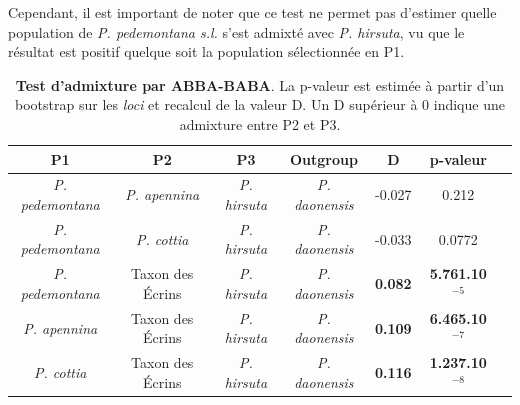 Cependant, il est important de noter que ce test ne permet pas d'estimer quelle population de \textit{P. pedemontana s.l.} s'est admixté avec \textit{P. hirsuta}, vu que le résultat est positif quelque soit la population sélectionnée en P1.

\begin{table}[!h]
\begin{tabular}{ccccccc}\\\toprule  
P1 & P2 & P3 & Outgroup & D & p-valeur \\ \midrule
\textit{P. pedemontana} & \textit{P. apennina} & \textit{P. hirsuta} & \textit{P. daonensis} & -0.027 & 0.212 \\
\textit{P. pedemontana} & \textit{P. cottia} & \textit{P. hirsuta} & \textit{P. daonensis} & -0.033 & 0.0772 \\ \midrule
\textit{P. pedemontana} & Taxon des Écrins & \textit{P. hirsuta} & \textit{P. daonensis} & \textbf{0.082} & \textbf{5.761.10$^{-5}$} \\
\textit{P. apennina} & Taxon des Écrins & \textit{P. hirsuta} & \textit{P. daonensis} & \textbf{0.109} & \textbf{6.465.10$^{-7}$} \\
\textit{P. cottia} & Taxon des Écrins & \textit{P. hirsuta} & \textit{P. daonensis} & \textbf{0.116} & \textbf{1.237.10$^{-8}$} \\ \bottomrule
\end{tabular}
\caption{\textbf{Test d'admixture par ABBA-BABA}. La p-valeur est estimée à partir d'un bootstrap sur les \textit{loci} et recalcul de la valeur D. Un D supérieur à 0 indique une admixture entre P2 et P3.}
\label{ABBA}
\end{table}

